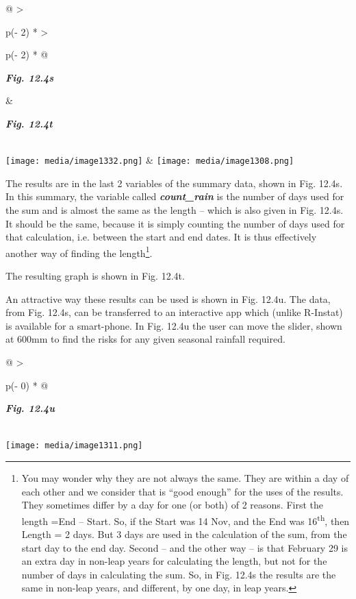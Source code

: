 \documentclass[
  letterpaper,
  DIV=11,
  numbers=noendperiod]{scrreprt}
\begin{document}
\begin{longtable}[]{@{}
  >{\raggedright\arraybackslash}p{(\columnwidth - 2\tabcolsep) * }
  >{\raggedright\arraybackslash}p{(\columnwidth - 2\tabcolsep) * }@{}}
\toprule\noalign{}
\begin{minipage}[b]{\linewidth}\raggedright
\textbf{\emph{Fig. 12.4s}}
\end{minipage} & \begin{minipage}[b]{\linewidth}\raggedright
\textbf{\emph{Fig. 12.4t}}
\end{minipage} \\
\midrule\noalign{}
\endhead
\bottomrule\noalign{}
\endlastfoot
\texttt{[image: media/image1332.png]}
&
\texttt{[image: media/image1308.png]} \\
\end{longtable}

The results are in the last 2 variables of the summary data, shown in
Fig. 12.4s. In this summary, the variable called
\textbf{\emph{count\_rain}} is the number of days used for the sum and
is almost the same as the length -- which is also given in Fig. 12.4s.
It should be the same, because it is simply counting the number of days
used for that calculation, i.e. between the start and end dates. It is
thus effectively another way of finding the length\footnote{You may
  wonder why they are not always the same. They are within a day of each
  other and we consider that is ``good enough'' for the uses of the
  results. They sometimes differ by a day for one (or both) of 2
  reasons. First the length =End -- Start. So, if the Start was 14 Nov,
  and the End was 16\textsuperscript{th}, then Length = 2 days. But 3
  days are used in the calculation of the sum, from the start day to the
  end day. Second -- and the other way -- is that February 29 is an
  extra day in non-leap years for calculating the length, but not for
  the number of days in calculating the sum. So, in Fig. 12.4s the
  results are the same in non-leap years, and different, by one day, in
  leap years.}.

The resulting graph is shown in Fig. 12.4t.

An attractive way these results can be used is shown in Fig. 12.4u. The
data, from Fig. 12.4s, can be transferred to an interactive app which
(unlike R-Instat) is available for a smart-phone. In Fig. 12.4u the user
can move the slider, shown at 600mm to find the risks for any given
seasonal rainfall required.

\begin{longtable}[]{@{}
  >{\raggedright\arraybackslash}p{(\columnwidth - 0\tabcolsep) * }@{}}
\toprule\noalign{}
\begin{minipage}[b]{\linewidth}\raggedright
\textbf{\emph{Fig. 12.4u}}
\end{minipage} \\
\midrule\noalign{}
\endhead
\bottomrule\noalign{}
\endlastfoot
\texttt{[image: media/image1311.png]} \\
\end{longtable}
\end{document}
